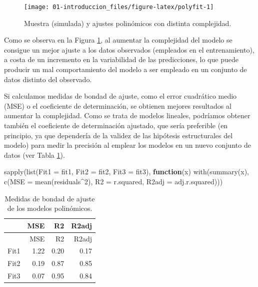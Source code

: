 \documentclass[
]{book}
\newenvironment{Shaded}{\begin{snugshade}}{\end{snugshade}}
\newcommand{\AttributeTok}[1]{\textcolor[rgb]{0.77,0.63,0.00}{#1}}
\newcommand{\ControlFlowTok}[1]{\textcolor[rgb]{0.13,0.29,0.53}{\textbf{#1}}}
\newcommand{\DecValTok}[1]{\textcolor[rgb]{0.00,0.00,0.81}{#1}}
\newcommand{\FunctionTok}[1]{\textcolor[rgb]{0.00,0.00,0.00}{#1}}
\newcommand{\NormalTok}[1]{#1}
\newcommand{\SpecialCharTok}[1]{\textcolor[rgb]{0.00,0.00,0.00}{#1}}
\theoremstyle{break}
\theoremstyle{nonumberplain}
\begin{document}
\begin{figure}[!htb]

{\centering \texttt{[image: 01-introduccion\_files/figure-latex/polyfit-1]} 

}

\caption{Muestra (simulada) y ajustes polinómicos con distinta complejidad.}\label{fig:polyfit}
\end{figure}

Como se observa en la Figura \ref{fig:polyfit}, al aumentar la complejidad del modelo se consigue un mejor ajuste a los datos observados (empleados en el entrenamiento), a costa de un incremento en la variabilidad de las predicciones, lo que puede producir un mal comportamiento del modelo a ser empleado en un conjunto de datos distinto del observado.

Si calculamos medidas de bondad de ajuste, como el error cuadrático medio (MSE) o el coeficiente de determinación, se obtienen mejores resultados al aumentar la complejidad.
Como se trata de modelos lineales, podríamos obtener también el coeficiente de determinación ajustado, que sería preferible (en principio, ya que dependería de la validez de las hipótesis estructurales del modelo) para medir la precisión al emplear los modelos en un nuevo conjunto de datos (ver Tabla \ref{tab:gof-polyfit}).

\begin{Shaded}
\begin{Highlighting}[]
\FunctionTok{sapply}\NormalTok{(}\FunctionTok{list}\NormalTok{(}\AttributeTok{Fit1 =}\NormalTok{ fit1, }\AttributeTok{Fit2 =}\NormalTok{ fit2, }\AttributeTok{Fit3 =}\NormalTok{ fit3), }
    \ControlFlowTok{function}\NormalTok{(x) }\FunctionTok{with}\NormalTok{(}\FunctionTok{summary}\NormalTok{(x), }
        \FunctionTok{c}\NormalTok{(}\AttributeTok{MSE =} \FunctionTok{mean}\NormalTok{(residuals}\SpecialCharTok{\^{}}\DecValTok{2}\NormalTok{), }\AttributeTok{R2 =}\NormalTok{ r.squared, }\AttributeTok{R2adj =}\NormalTok{ adj.r.squared)))}
\end{Highlighting}
\end{Shaded}

\begin{longtable}[]{@{}lrrr@{}}
\caption{\label{tab:gof-polyfit}Medidas de bondad de ajuste de los modelos polinómicos.}\tabularnewline
\toprule()
& MSE & R2 & R2adj \\
\midrule()
\endfirsthead
\toprule()
& MSE & R2 & R2adj \\
\midrule()
\endhead
Fit1 & 1.22 & 0.20 & 0.17 \\
Fit2 & 0.19 & 0.87 & 0.85 \\
Fit3 & 0.07 & 0.95 & 0.84 \\
\bottomrule()
\end{longtable}
\end{document}
